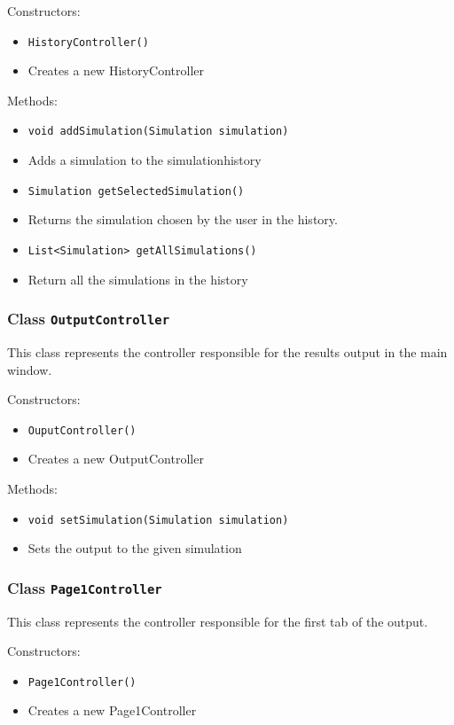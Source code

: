 \documentclass[parskip=full,11pt]{scrartcl}
\begin{document}
Constructors:
\begin{itemize}\itemsep -10pt
\item \texttt{HistoryController()}
\item[] Creates a new HistoryController
\end{itemize}

Methods:
\begin{itemize}\itemsep -10pt
\item \texttt{void addSimulation(Simulation simulation)}
\item[] Adds a simulation to the simulationhistory

\item \texttt{Simulation getSelectedSimulation()}
\item[] Returns the simulation chosen by the user in the history.

\item \texttt{List<Simulation> getAllSimulations()}
\item[] Return all the simulations in the history
\end{itemize}

\subsubsection{Class \texttt{OutputController}}
This class represents the controller responsible for the results output in the main window.

Constructors:
\begin{itemize}\itemsep -10pt
\item \texttt{OuputController()}
\item[] Creates a new OutputController
\end{itemize}

Methods:
\begin{itemize}\itemsep -10pt
\item \texttt{void setSimulation(Simulation simulation)}
\item[] Sets the output to the given simulation

\end{itemize}

\subsubsection{Class \texttt{Page1Controller}}
This class represents the controller responsible for the first tab of the output.

Constructors:
\begin{itemize}\itemsep -10pt
\item \texttt{Page1Controller()}
\item[] Creates a new Page1Controller
\end{itemize}
\end{document}
